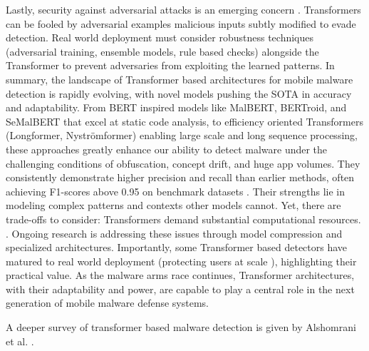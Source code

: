 Lastly, security against adversarial attacks is an emerging concern \cite{vorlesung}. 
Transformers can be fooled by adversarial examples malicious inputs subtly modified to evade detection. 
Real world deployment must consider robustness techniques (adversarial training, ensemble models, 
rule based checks) alongside the Transformer to prevent adversaries from exploiting the learned 
patterns. 
In summary, the landscape of Transformer based architectures for mobile malware detection is rapidly 
evolving, with novel models pushing the SOTA in accuracy and adaptability. 
From BERT inspired models like MalBERT, BERTroid, and SeMalBERT that excel at static code analysis, 
to efficiency oriented Transformers (Longformer, Nyströmformer) enabling large scale and long sequence 
processing, these approaches greatly enhance our ability to detect malware under the challenging 
conditions of obfuscation, concept drift, and huge app volumes. 
They consistently demonstrate higher precision and recall than earlier methods, 
often achieving F1-scores above 0.95 on benchmark datasets
\cite{malbert_two, bertroid, detectbert}. 
Their strengths lie in modeling complex patterns and contexts other models cannot. 
Yet, there are trade-offs to consider: Transformers demand substantial computational resources.
. Ongoing research is addressing these issues through model compression and specialized architectures. 
Importantly, some Transformer based detectors have matured to real world deployment 
(protecting users at scale
\cite{htgt}
), highlighting their practical value. 
As the malware arms race continues, Transformer architectures, with their adaptability and power, 
are capable to play a central role in the next generation of mobile malware defense systems.

A deeper survey of transformer based malware detection is given by Alshomrani et al. 
\cite{transformer_malware_overview}. 